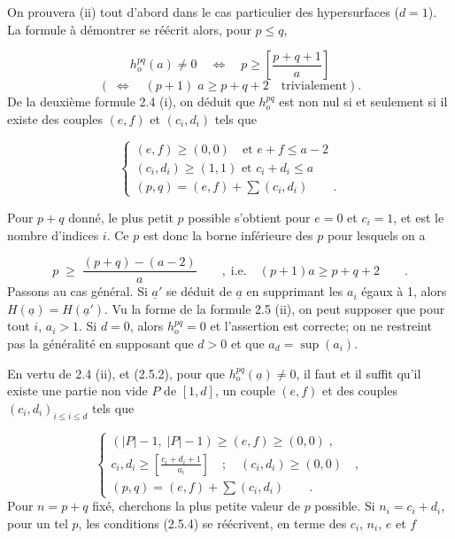 On prouvera (ii) tout d'abord dans le cas particulier des hypersurfaces ($d = 1$). La formule à démontrer se réécrit alors, pour $p \leqslant q$,

\begin{equation}\tag{2.5.2}
h_o^{pq}(a) \neq 0 \quad \Longleftrightarrow \quad p \geqslant \left[\frac{p+q+1}{a}\right]
\end{equation}
\begin{equation*}
(\; \Longleftrightarrow \quad (p+1) \; a \geqslant p+q+2 \quad \mbox{trivialement}).
\end{equation*}
De la deuxième formule 2.4 (i), on déduit que $h_o^{pq}$ est non nul si et seulement si il existe des couples $(e,f)$ et $(c_i,d_i)$ tels que

\begin{equation}\tag{2.5.3}
\left\{
\begin{array}{l}
(e,f) \geqslant (0,0) \quad \mbox{et } e+f \leqslant a-2 \\[3mm]
(c_i,d_i) \geqslant (1,1) \mbox{ et } c_i+d_i \leqslant a \\[3mm]
(p,q) = (e,f) + \sum (c_i,d_i) \qquad .
\end{array}
\right.
\end{equation}


Pour $p+q$ donné, le plus petit $p$ possible s'obtient pour $e = 0$ et $c_i = 1$, et est le nombre d'indices $i$. Ce $p$ est donc la borne inférieure des $p$ pour lesquels on a

\begin{equation*}
p \;\geqslant\; \frac{(p+q)-(a-2)}{a} \qquad , \; \mbox{i.e.} \quad (p+1)a \geqslant p+q+2 \qquad .
\end{equation*}
Passons au cas général. Si $\underline{a}'$ se déduit de $\underline{a}$ en supprimant les $a_i$ égaux à 1, alors $H(\underline{a}) = H(\underline{a}')$. Vu la forme de la formule 2.5 (ii), on peut supposer que pour tout $i$, $a_i > 1$. Si $d = 0$, alors $h_o^{pq} = 0$ et l'assertion est correcte; on ne restreint pas la généralité en supposant que $d > 0$ et que $a_d = \sup(a_i)$.

En vertu de 2.4 (ii), et (2.5.2), pour que $h_o^{pq}(\underline{a}) \neq 0$, il faut et il suffit qu'il existe une partie non vide $P$ de $[1,d]$, un couple $(e,f)$ et des couples $(c_i,d_i)_{i \leqslant i \leqslant d}$ tels que

\begin{equation}\tag{2.5.4}
\left\{
\begin{array}{l}
(|P|-1, \; |P|-1) \geqslant (e,f) \geqslant (0,0) \; , \\[3mm]
c_i,d_i \geqslant \left[{\displaystyle \frac{c_i+d_i+1}{a_i}}\right] \quad ; \quad (c_i,d_i) \geqslant (0,0) \quad , \\[3mm]
(p,q) = (e,f) + \sum (c_i,d_i) \qquad .
\end{array}
\right.
\end{equation}
Pour $n = p+q$ fixé, cherchons la plus petite valeur de $p$ possible. Si $n_i = c_i + d_i$, pour un tel $p$, les conditions (2.5.4) se réécrivent, en terme des $c_i$, $n_i$, $e$ et $f$ 


